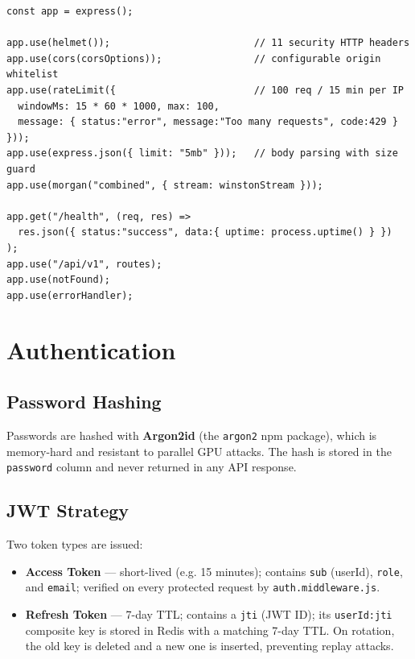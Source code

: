 \documentclass[12pt,a4paper]{report}
\begin{document}
\begin{lstlisting}[style=jsStyle, caption={Express application setup with security middleware}]
const app = express();

app.use(helmet());                         // 11 security HTTP headers
app.use(cors(corsOptions));                // configurable origin whitelist
app.use(rateLimit({                        // 100 req / 15 min per IP
  windowMs: 15 * 60 * 1000, max: 100,
  message: { status:"error", message:"Too many requests", code:429 }
}));
app.use(express.json({ limit: "5mb" }));   // body parsing with size guard
app.use(morgan("combined", { stream: winstonStream }));

app.get("/health", (req, res) =>
  res.json({ status:"success", data:{ uptime: process.uptime() } })
);
app.use("/api/v1", routes);
app.use(notFound);
app.use(errorHandler);
\end{lstlisting}

\section{Authentication}

\subsection{Password Hashing}

Passwords are hashed with \textbf{Argon2id} (the \texttt{argon2} npm package), which is
memory-hard and resistant to parallel GPU attacks. The hash is stored in the \texttt{password}
column and never returned in any API response.

\subsection{JWT Strategy}

Two token types are issued:
\begin{itemize}
  \item \textbf{Access Token} — short-lived (e.g. 15 minutes); contains \texttt{sub} (userId),
    \texttt{role}, and \texttt{email}; verified on every protected request by
    \texttt{auth.middleware.js}.
  \item \textbf{Refresh Token} — 7-day TTL; contains a \texttt{jti} (JWT ID); its
    \texttt{userId:jti} composite key is stored in Redis with a matching 7-day TTL. On
    rotation, the old key is deleted and a new one is inserted, preventing replay attacks.
\end{itemize}
\end{document}
